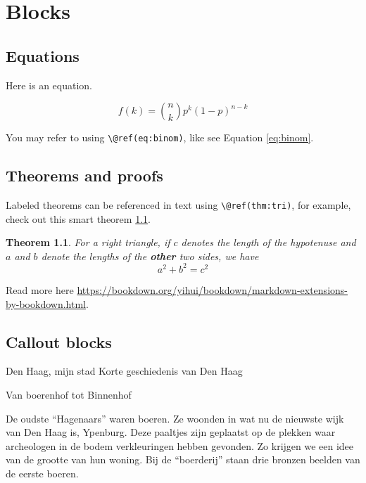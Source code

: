 \documentclass[
  a4paper,
]{book}
\newtheorem{theorem}{Theorem}[chapter]
\theoremstyle{definition}
\theoremstyle{definition}
\theoremstyle{definition}
\theoremstyle{definition}
\theoremstyle{remark}
\begin{document}
\hypertarget{blocks}{%
\chapter{Blocks}\label{blocks}}

\hypertarget{equations}{%
\section{Equations}\label{equations}}

Here is an equation.

\begin{equation} 
  f\left(k\right) = \binom{n}{k} p^k\left(1-p\right)^{n-k}
  \label{eq:binom}
\end{equation}

You may refer to using \texttt{\textbackslash{}@ref(eq:binom)}, like see Equation \eqref{eq:binom}.

\hypertarget{theorems-and-proofs}{%
\section{Theorems and proofs}\label{theorems-and-proofs}}

Labeled theorems can be referenced in text using \texttt{\textbackslash{}@ref(thm:tri)}, for example, check out this smart theorem \ref{thm:tri}.

\begin{theorem}
\protect\hypertarget{thm:tri}{}\label{thm:tri}For a right triangle, if \(c\) denotes the \emph{length} of the hypotenuse
and \(a\) and \(b\) denote the lengths of the \textbf{other} two sides, we have
\[a^2 + b^2 = c^2\]
\end{theorem}

Read more here \url{https://bookdown.org/yihui/bookdown/markdown-extensions-by-bookdown.html}.

\hypertarget{callout-blocks}{%
\section{Callout blocks}\label{callout-blocks}}

Den Haag, mijn stad
Korte geschiedenis van Den Haag

Van boerenhof tot Binnenhof

De oudste ``Hagenaars'' waren boeren. Ze woonden in wat nu de nieuwste wijk van Den Haag is, Ypenburg. Deze paaltjes zijn geplaatst op de plekken waar archeologen in de bodem verkleuringen hebben gevonden. Zo krijgen we een idee van de grootte van hun woning. Bij de ``boerderij'' staan drie bronzen beelden van de eerste boeren.
\end{document}
